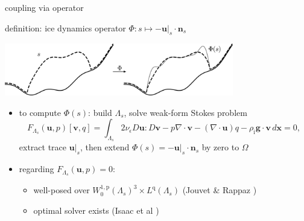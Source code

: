 \documentclass[usepdftitle=false]{beamer}
\newcommand{\eps}{\epsilon}
\newcommand{\Div}{\nabla\cdot}
\newcommand{\bg}{\mathbf{g}}
\newcommand{\bn}{\mathbf{n}}
\newcommand{\bu}{\mathbf{u}}
\newcommand{\bv}{\mathbf{v}}
\newcommand{\bx}{\mathbf{x}}
\newcommand{\rhoi}{\rho_{\text{i}}}
\newcommand{\pp}{{\text{p}}}
\newcommand{\qq}{{\text{q}}}
\newcommand{\bus}{\bu|_s}
\begin{document}
\begin{frame}{coupling via operator}

\begin{block}{definition: ice dynamics operator}
$\Phi : s \mapsto - \bus \cdot \bn_s$

\vspace{-3mm}

\hfill \includegraphics[width=0.75\textwidth]{figs/idoaction.png}
\end{block}

\begin{itemize}
\item to compute $\Phi(s)$: build $\Lambda_s$, solve weak-form Stokes problem
    $$F_{\Lambda_s}(\bu,p)[\bv,q] = \int_{\Lambda_s} 2 \nu_\eps D\bu : D\bv - p \Div\bv - (\Div\bu) q - \rhoi \bg \cdot \bv\,d\bx = 0,$$
extract trace $\bus$, then extend $\Phi(s) = -\bus \cdot \bn_s$ by zero to $\Omega$
\item regarding $F_{\Lambda_s}(\bu,p) = 0$:
    \begin{itemize}
    \item well-posed over $W_0^{1,\pp}(\Lambda_s)^3 \times L^\qq(\Lambda_s)$ (Jouvet \& Rappaz \cite{JouvetRappaz2011})
    \item optimal solver exists (Isaac et al \cite{IsaacStadlerGhattas2015})
    \end{itemize}
\end{itemize}

\end{frame}
\end{document}
